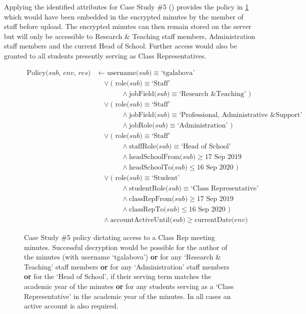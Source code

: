 Applying the identified attributes for Case Study \#5 () provides the \thePolicyLang policy in \cref{fig:case_study_policy_5} which would have been embedded in the encrypted minutes by the member of staff before upload. The encrypted minutes can then remain stored on the server but will only be accessible to Research \& Teaching staff members, Administration staff members and the current Head of School. Further access would also be granted to all students presently serving as Class Representatives.

\begin{figure}[ht]
  \centering
\begin{align*}
  \text{Policy($sub$, $env$, $res$)}
  &
    \leftarrow
    \text{username($sub$)} \equiv \text{`tgalabova'}
  \\
  &
    \phantom{::}\vee
    \text{( role($sub$)} \equiv \text{`Staff'}
  \\
  &
    \phantom{::::::::}\wedge
    \text{jobField($sub$)} \equiv \text{`Research \& Teaching' )}
  \\
  &
    \phantom{::}\vee
    \text{( role($sub$)} \equiv \text{`Staff'}
  \\
  &
    \phantom{::::::::}\wedge
    \text{jobField($sub$)} \equiv \text{`Professional, Administrative \& Support'}
  \\
  &
    \phantom{::::::::}\wedge
    \text{jobRole($sub$)} \equiv \text{`Administration' )}
  \\
  &
    \phantom{::}\vee
    \text{( role($sub$)} \equiv \text{`Staff'}
  \\
  &
    \phantom{::::::::}\wedge
    \text{staffRole($sub$)} \equiv \text{`Head of School'}
  \\
  &
    \phantom{::::::::}\wedge
    \text{headSchoolFrom($sub$)} \geq \text{17 Sep 2019}
  \\
  &
    \phantom{::::::::}\wedge
    \text{headSchoolTo($sub$)} \leq \text{16 Sep 2020 )}
  \\
  &
    \phantom{::}\vee
    \text{( role($sub$)} \equiv \text{`Student'}
  \\
  &
    \phantom{::::::::}\wedge
    \text{studentRole($sub$)} \equiv \text{`Class Representative'}
  \\
  &
    \phantom{::::::::}\wedge
    \text{classRepFrom($sub$)} \geq \text{17 Sep 2019}
  \\
  &
    \phantom{::::::::}\wedge
    \text{classRepTo($sub$)} \leq \text{16 Sep 2020 )}
  \\
  &
    \phantom{::}\wedge
    \text{accountActiveUntil($sub$)} \geq \text{currentDate($env$)}
\end{align*}
  \caption{
    \label{fig:case_study_policy_5}
    Case Study \#5 policy dictating access to a Class Rep meeting minutes.
    Successful decryption would be possible for the author of the minutes (with username `tgalabova') \textbf{or} for any `Research \& Teaching' staff members \textbf{or} for any `Administration' staff members \textbf{or} for the `Head of School', if their serving term matches the academic year of the minutes \textbf{or} for any students serving as a `Class Representative' in the academic year of the minutes. In all cases an active account is also required.
  }
\end{figure}
